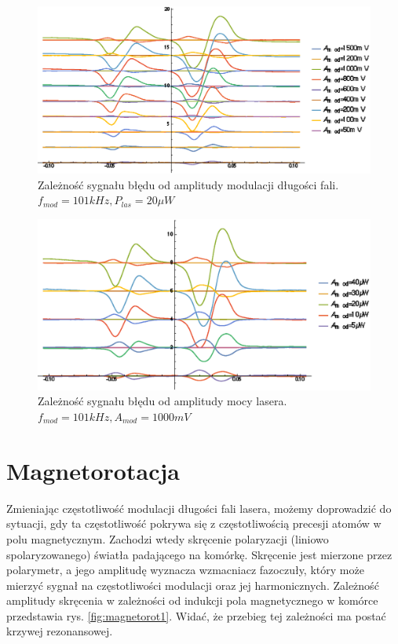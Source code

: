 \documentclass[a4paper,10pt]{article}
\begin{document}

\begin{figure}[h!]
\centering
 \includegraphics[width=\textwidth]{panoramy_1H_oda.eps}
 \caption{Zależność sygnału błędu od amplitudy modulacji długości fali. $f_{mod}=101kHz, P_{las}=20 \mu W$}
 \label{fig:panoda}
\end{figure}

\begin{figure}[h!]
\centering
 \includegraphics[width=\textwidth]{panoramy_1H_odp.eps}
 \caption{Zależność sygnału błędu od amplitudy mocy lasera. $f_{mod}=101kHz, A_{mod}=1000mV$}
 \label{fig:panodp}
\end{figure}

\section{Magnetorotacja}
\label{sec:magnetorotacja}


Zmieniając częstotliwość modulacji długości fali lasera, możemy doprowadzić do sytuacji, gdy ta częstotliwość pokrywa się z częstotliwością precesji atomów w polu magnetycznym.
Zachodzi wtedy skręcenie polaryzacji (liniowo spolaryzowanego) światła padającego na komórkę. Skręcenie jest mierzone przez polarymetr, a jego amplitudę wyznacza wzmacniacz fazoczuły, który może mierzyć sygnał na częstotliwości modulacji oraz jej harmonicznych. Zależność amplitudy skręcenia w zależności od indukcji pola magnetycznego w komórce przedstawia rys. \ref{fig:magnetorot1}. Widać, że przebieg tej zależności ma postać krzywej rezonansowej.
\end{document}
